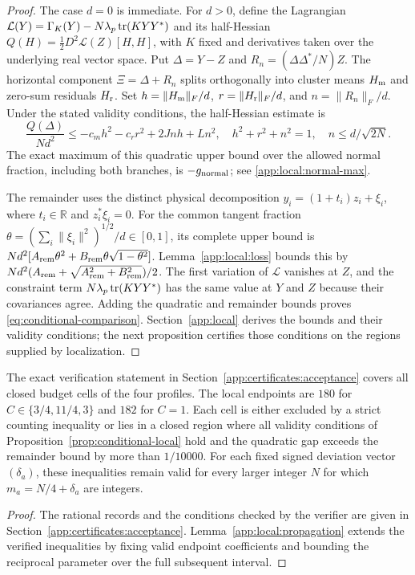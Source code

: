 \begin{proof}
The case $d=0$ is immediate. For $d>0$, define the Lagrangian
$\mathcal L(Y)=\Gamma_K(Y)-N\lambda_p\operatorname{tr}(KYY^*)$ and its half-Hessian
$Q(H)=\tfrac12D^2\mathcal L(Z)[H,H]$, with $K$ fixed and derivatives
taken over the underlying real vector space. Put $\Delta=Y-Z$ and
$R_n=(\Delta\Delta^*/N)Z$. The horizontal component
$\Xi=\Delta+R_n$ splits orthogonally into cluster means $H_{\rm m}$ and
zero-sum residuals $H_{\rm r}$. Set $h=\|H_{\rm m}\|_F/d$,
$r=\|H_{\rm r}\|_F/d$, and $n=\|R_n\|_F/d$. Under the stated validity
conditions, the half-Hessian estimate is
\begin{equation}\label{eq:main-quadratic}
 \frac{Q(\Delta)}{Nd^2}\le-c_mh^2-c_rr^2+2Jnh+Ln^2,
 \quad h^2+r^2+n^2=1,\quad n\le d/\sqrt{2N}.
\end{equation}
The exact maximum of this quadratic upper bound over the allowed normal
fraction, including both branches, is $-g_{\rm normal}$; see
\eqref{app:local:normal-max}.

The remainder uses the distinct physical decomposition
$y_i=(1+t_i)z_i+\xi_i$, where $t_i\in\mathbb R$ and $z_i^*\xi_i=0$.
For the common tangent fraction
$\theta=(\sum_i\|\xi_i\|^2)^{1/2}/d\in[0,1]$, its complete upper bound is
$Nd^2[A_{\rm rem}\theta^2+B_{\rm rem}\theta\sqrt{1-\theta^2}]$.
Lemma~\ref{app:local:loss} bounds this by
$Nd^2(A_{\rm rem}+\sqrt{A_{\rm rem}^2+B_{\rm rem}^2})/2$.
The first variation of $\mathcal L$ vanishes at $Z$, and the constraint
term $N\lambda_p\operatorname{tr}(KYY^*)$ has the same value at $Y$ and $Z$ because
their covariances agree. Adding the quadratic and remainder bounds proves
\eqref{eq:conditional-comparison}. Section~\ref{app:local} derives the
bounds and their validity conditions; the next proposition certifies
those conditions on the regions supplied by localization.
\end{proof}

\begin{proposition}
\label{prop:finite-acceptance}
The exact verification statement in Section~\ref{app:certificates:acceptance}
covers all closed budget cells of the four profiles. The local endpoints
are $180$ for $C\in\{3/4,11/4,3\}$ and $182$ for $C=1$.
Each cell is either excluded by a strict counting inequality or lies in a
closed region where all validity conditions of
Proposition~\ref{prop:conditional-local} hold and the quadratic gap exceeds
the remainder bound by more than $1/10000$.
For each fixed signed deviation vector $(\delta_a)$, these inequalities
remain valid for every larger integer $N$ for which
$m_a=N/4+\delta_a$ are integers.
\end{proposition}
\begin{proof}
The rational records and the conditions checked by the verifier are given in
Section~\ref{app:certificates:acceptance}.
Lemma~\ref{app:local:propagation} extends the verified inequalities by
fixing valid endpoint coefficients and bounding the reciprocal parameter
over the full subsequent interval.
\end{proof}

